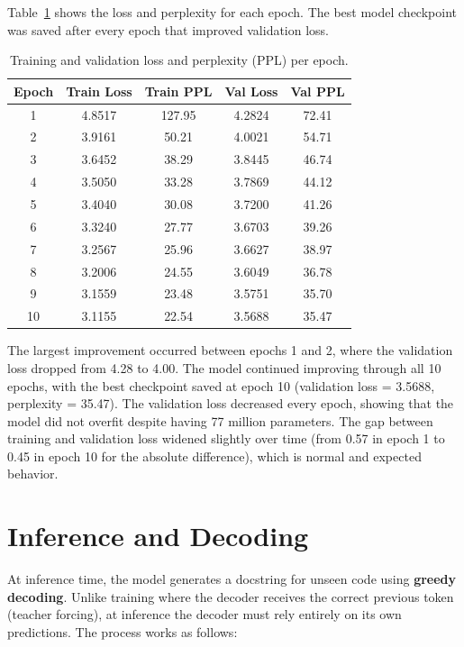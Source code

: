 \documentclass[11pt]{article}
\begin{document}
Table~\ref{tab:training_results} shows the loss and perplexity for each epoch. The best model checkpoint was saved after every epoch that improved validation loss.

\begin{table}[h]
\centering
\begin{tabular}{@{}ccccc@{}}
\toprule
\textbf{Epoch} & \textbf{Train Loss} & \textbf{Train PPL} & \textbf{Val Loss} & \textbf{Val PPL} \\
\midrule
1  & 4.8517 & 127.95 & 4.2824 & 72.41 \\
2  & 3.9161 & 50.21  & 4.0021 & 54.71 \\
3  & 3.6452 & 38.29  & 3.8445 & 46.74 \\
4  & 3.5050 & 33.28  & 3.7869 & 44.12 \\
5  & 3.4040 & 30.08  & 3.7200 & 41.26 \\
6  & 3.3240 & 27.77  & 3.6703 & 39.26 \\
7  & 3.2567 & 25.96  & 3.6627 & 38.97 \\
8  & 3.2006 & 24.55  & 3.6049 & 36.78 \\
9  & 3.1559 & 23.48  & 3.5751 & 35.70 \\
10 & 3.1155 & 22.54  & 3.5688 & 35.47 \\
\bottomrule
\end{tabular}
\caption{Training and validation loss and perplexity (PPL) per epoch.}
\label{tab:training_results}
\end{table}

The largest improvement occurred between epochs 1 and 2, where the validation loss dropped from 4.28 to 4.00. The model continued improving through all 10 epochs, with the best checkpoint saved at epoch 10 (validation loss = 3.5688, perplexity = 35.47). The validation loss decreased every epoch, showing that the model did not overfit despite having 77 million parameters. The gap between training and validation loss widened slightly over time (from 0.57 in epoch 1 to 0.45 in epoch 10 for the absolute difference), which is normal and expected behavior.

\section{Inference and Decoding}

At inference time, the model generates a docstring for unseen code using \textbf{greedy decoding}. Unlike training where the decoder receives the correct previous token (teacher forcing), at inference the decoder must rely entirely on its own predictions. The process works as follows:
\end{document}

